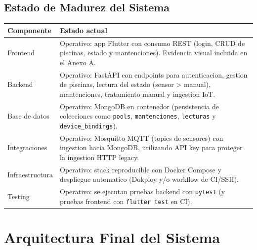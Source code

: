 \documentclass[11pt, a4paper]{article}
\begin{document}
\subsection{Estado de Madurez del Sistema}
\begin{longtable}{@{} p{3cm} p{11.2cm} @{}}
  \toprule
  \textbf{Componente} & \textbf{Estado actual} \\
  \midrule
  Frontend & Operativo: app Flutter con consumo REST (login, CRUD de piscinas, estado y mantenciones). Evidencia visual incluida en el Anexo A. \\
  \midrule
  Backend & Operativo: FastAPI con endpoints para autenticacion, gestion de piscinas, lectura del estado (sensor > manual), mantenciones, tratamiento manual y ingestion IoT. \\
  \midrule
  Base de datos & Operativo: MongoDB en contenedor (persistencia de colecciones como \texttt{pools}, \texttt{mantenciones}, \texttt{lecturas} y \texttt{device\_bindings}). \\
  \midrule
  Integraciones & Operativo: Mosquitto MQTT (topics de sensores) con ingestion hacia MongoDB, utilizando API key para proteger la ingestion HTTP legacy. \\
  \midrule
  Infraestructura & Operativo: stack reproducible con Docker Compose y despliegue automatico (Dokploy y/o workflow de CI/SSH). \\
  \midrule
  Testing & Operativo: se ejecutan pruebas backend con \texttt{pytest} (y pruebas frontend con \texttt{flutter test} en CI). \\
  \bottomrule
\end{longtable}

\section{Arquitectura Final del Sistema}
\end{document}
